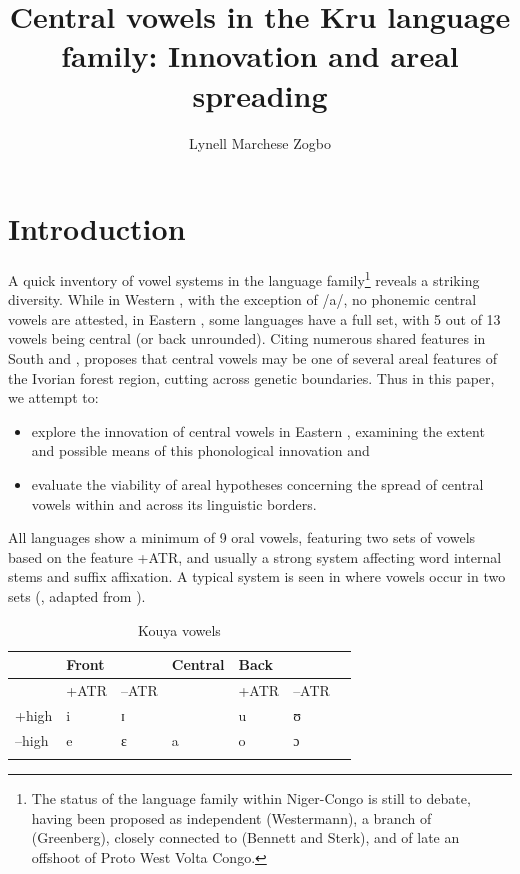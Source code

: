 \documentclass[output=paper
,newtxmath
,modfonts
,nonflat]{langsci/langscibook}
\title{Central vowels in the Kru language family: Innovation and areal spreading}
\author{Lynell Marchese Zogbo\affiliation{University of the Free State; Institut de Linguistique Appliquée, Abidjan}}
\begin{document}
\maketitle
\providecommand{\nocaption}[1]{{\color{red} Please provide a caption}}
\section{Introduction}\label{sec:zogbo:1} 

A quick inventory of vowel systems in the  language family\footnote{The status of the  language family within Niger-Congo is still  to debate, having been proposed as independent (Westermann), a branch of  (Greenberg), closely connected to  (Bennett and Sterk), and of late \citep[18]{Williamson2000} an offshoot of Proto West Volta Congo.}  reveals a striking diversity.  While in Western , with the exception of /a/, no phonemic central vowels are attested, in Eastern , some languages have a full set, with 5 out of 13 vowels being central (or back unrounded). Citing numerous shared features in South  and , \citet{Vydrine2009} proposes that central vowels may be one of several areal features of the Ivorian forest region, cutting across genetic boundaries.  Thus in this paper, we attempt to:

\begin{itemize}
\item explore the innovation of central vowels in Eastern , examining the extent and possible means of this phonological innovation and \\[-0.75cm]
\item evaluate the viability of areal hypotheses concerning the spread of central vowels within  and across its linguistic borders. 
\end{itemize}

All  languages show a minimum of 9 oral vowels, featuring two sets of vowels based on the feature +ATR, and usually a strong  system affecting word internal stems and suffix affixation. A typical system is seen in  where vowels occur in two sets (, adapted from \citealt[50]{Saunders2009}).

\begin{table}[h]
\begin{tabular}{lllllll}
\lsptoprule
& Front   &&   Central &   Back &\\
\midrule
& +ATR & –ATR   &   &  +ATR &  –ATR\\

+high  &  i &	ɪ    &&   u  &  ʊ\\

–high  &  e & ɛ  &  a  &  o & ɔ\\
\lspbottomrule
\end{tabular}  
\caption{Kouya vowels}
\label{tab:zogbo:1}
\end{table}
\end{document}
